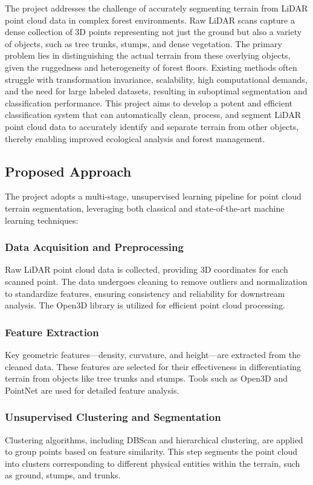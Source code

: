 \documentclass[../report.tex]{subfiles}
\begin{document}
The project addresses the challenge of accurately segmenting terrain from LiDAR point cloud data in complex forest environments. Raw LiDAR scans capture a dense collection of 3D points representing not just the ground but also a variety of objects, such as tree trunks, stumps, and dense vegetation. The primary problem lies in distinguishing the actual terrain from these overlying objects, given the ruggedness and heterogeneity of forest floors. Existing methods often struggle with transformation invariance, scalability, high computational demands, and the need for large labeled datasets, resulting in suboptimal segmentation and classification performance. This project aims to develop a potent and efficient classification system that can automatically clean, process, and segment LiDAR point cloud data to accurately identify and separate terrain from other objects, thereby enabling improved ecological analysis and forest management.
    \subsection{Proposed Approach}
    
    \label{sec:introduction:proposed_approach}
The project adopts a multi-stage, unsupervised learning pipeline for point cloud terrain segmentation, leveraging both classical and state-of-the-art machine learning techniques:
\subsubsection{Data Acquisition and Preprocessing}
Raw LiDAR point cloud data is collected, providing 3D coordinates for each scanned point. The data undergoes cleaning to remove outliers and normalization to standardize features, ensuring consistency and reliability for downstream analysis. The Open3D library is utilized for efficient point cloud processing.
\subsubsection{Feature Extraction}
Key geometric features—density, curvature, and height—are extracted from the cleaned data. These features are selected for their effectiveness in differentiating terrain from objects like tree trunks and stumps. Tools such as Open3D and PointNet are used for detailed feature analysis.\cite{Open3D_Library}\cite{PointNet}
\subsubsection{Unsupervised Clustering and Segmentation}
Clustering algorithms, including DBScan and hierarchical clustering, are applied to group points based on feature similarity. This step segments the point cloud into clusters corresponding to different physical entities within the terrain, such as ground, stumps, and trunks.\cite{DBSCAN}\cite{DBSCan_Grammarly}
\end{document}

